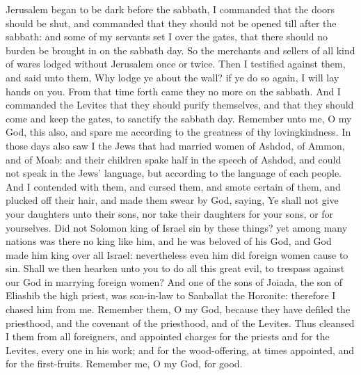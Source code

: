 Jerusalem began to be dark before the sabbath, I commanded that the doors should be shut, and commanded that they should not be opened till after the sabbath: and some of my servants set I over the gates, that there should no burden be brought in on the sabbath day. So the merchants and sellers of all kind of wares lodged without Jerusalem once or twice. Then I testified against them, and said unto them, Why lodge ye about the wall? if ye do so again, I will lay hands on you. From that time forth came they no more on the sabbath. And I commanded the Levites that they should purify themselves, and that they should come and keep the gates, to sanctify the sabbath day. Remember unto me, O my God, this also, and spare me according to the greatness of thy lovingkindness.  In those days also saw I the Jews that had married women of Ashdod, of Ammon, and of Moab: and their children spake half in the speech of Ashdod, and could not speak in the Jews’ language, but according to the language of each people. And I contended with them, and cursed them, and smote certain of them, and plucked off their hair, and made them swear by God, saying, Ye shall not give your daughters unto their sons, nor take their daughters for your sons, or for yourselves. Did not Solomon king of Israel sin by these things? yet among many nations was there no king like him, and he was beloved of his God, and God made him king over all Israel: nevertheless even him did foreign women cause to sin. Shall we then hearken unto you to do all this great evil, to trespass against our God in marrying foreign women?  And one of the sons of Joiada, the son of Eliashib the high priest, was son-in-law to Sanballat the Horonite: therefore I chased him from me. Remember them, O my God, because they have defiled the priesthood, and the covenant of the priesthood, and of the Levites.  Thus cleansed I them from all foreigners, and appointed charges for the priests and for the Levites, every one in his work; and for the wood-offering, at times appointed, and for the first-fruits. Remember me, O my God, for good. 